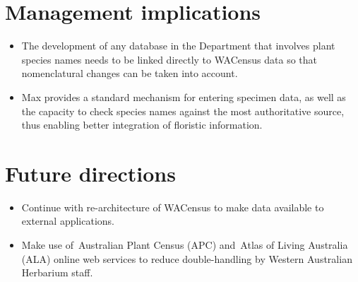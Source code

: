 \documentclass[version=last,
    paper=a4, %
    10pt, %
    usenames,
    dvipsnames,
    oneside, %
    headings=openany, %
    DIV=15 %
]{scrbook}
\begin{document}
\section*{Management implications}
\begin{itemize}
\itemsep1pt\parskip0pt
\item
  The development of any database in the Department that involves plant
  species names needs to be linked directly to WACensus data so that
  nomenclatural changes can be taken into account.
\item
  Max provides a standard mechanism for entering specimen data, as well
  as the capacity to check species names against the most authoritative
  source, thus enabling better integration of floristic information.
\end{itemize}



\section*{Future directions}
\begin{itemize}
\itemsep1pt\parskip0pt
\item
  Continue with re-architecture of WACensus to make data available to
  external applications.
\item
  Make use of~Australian Plant Census (APC) and~Atlas of Living
  Australia (ALA) online web services to reduce double-handling by
  Western Australian Herbarium staff.
\end{itemize}



\end{document}
